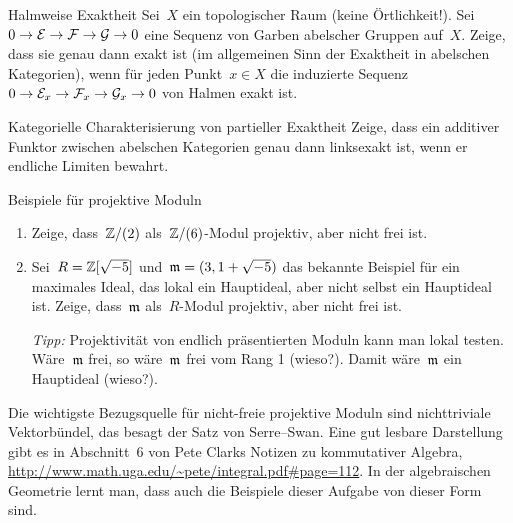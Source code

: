 \documentclass{uebblatt}
\begin{document}

\begin{aufgabe}{Halmweise Exaktheit}
Sei~$X$ ein topologischer Raum (keine Örtlichkeit!). Sei~$0 \to \mathcal{E} \to \mathcal{F} \to
\mathcal{G} \to 0$ eine Sequenz von Garben abelscher Gruppen auf~$X$. Zeige, dass sie
genau dann exakt ist (im allgemeinen Sinn der Exaktheit in abelschen
Kategorien), wenn für jeden Punkt~$x \in X$ die induzierte Sequenz~$0 \to \mathcal{E}_x
\to \mathcal{F}_x \to \mathcal{G}_x \to 0$ von Halmen exakt ist.
\end{aufgabe}

\begin{aufgabe}{Kategorielle Charakterisierung von partieller Exaktheit}
Zeige, dass ein additiver Funktor zwischen abelschen Kategorien genau dann
linksexakt ist, wenn er endliche Limiten bewahrt.
\end{aufgabe}

\begin{aufgabe}{Beispiele für projektive Moduln}
\begin{enumerate}
\item Zeige, dass~$\mathbb{Z}/(2)$ als~$\mathbb{Z}/(6)$-Modul projektiv, aber
nicht frei ist.
\item Sei~$R = \mathbb{Z}[\sqrt{-5}]$ und~$\mathfrak{m} = (3, 1+\sqrt{-5})$ das bekannte
Beispiel für ein maximales Ideal, das lokal ein Hauptideal, aber nicht selbst
ein Hauptideal ist. Zeige, dass~$\mathfrak{m}$ als~$R$-Modul projektiv, aber nicht frei
ist.

\emph{Tipp:} Projektivität von endlich präsentierten Moduln kann man lokal
testen. Wäre~$\mathfrak{m}$ frei, so wäre~$\mathfrak{m}$ frei vom Rang 1 (wieso?). Damit
wäre~$\mathfrak{m}$ ein Hauptideal (wieso?).
\end{enumerate}

{\scriptsize Die wichtigste Bezugsquelle für nicht-freie projektive Moduln sind
nichttriviale Vektorbündel, das besagt der Satz von Serre--Swan. Eine gut
lesbare Darstellung gibt es in Abschnitt~6 von Pete Clarks Notizen zu
kommutativer Algebra, \url{http://www.math.uga.edu/~pete/integral.pdf#page=112}.
In der algebraischen Geometrie lernt man, dass auch die Beispiele dieser
Aufgabe von dieser Form sind.\par}
\end{aufgabe}
\end{document}
